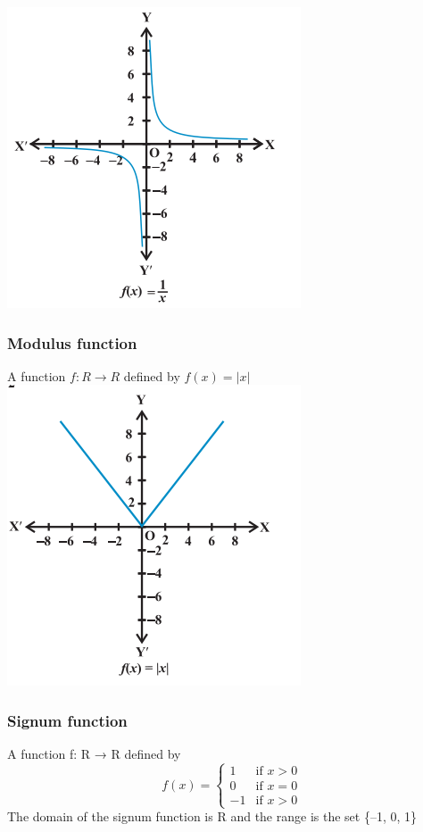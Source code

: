 \documentclass{article}
\begin{document}
\begin{multicols}{2}
 \includegraphics[scale=0.5]{6.png}


\subsubsection*{Modulus function}
 A function $f:R\rightarrow R$ defined by $f(x)=|x|$
 \includegraphics[scale=0.5]{7.png}

 \subsubsection*{Signum function}
 A function f: R → R defined by 
 \begin{equation*}
f(x)=
    \begin{cases}
        1 & \text{if } x>0\\
        0 & \text{if } x=0 \\
        -1 & \text{if } x >0
    \end{cases}
\end{equation*}
The domain of the signum function is R and the range is
the set \{–1, 0, 1\}


\end{multicols}
\end{document}
